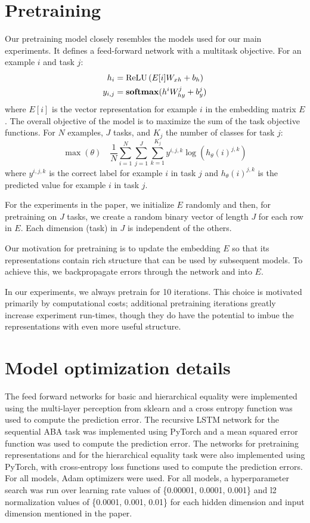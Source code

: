 \section{Pretraining}\label{app:pretraining}

Our pretraining model closely resembles the models used for our main experiments. It defines a feed-forward network with a multitask objective. For an example $i$ and task $j$:
%
\begin{align}
  h_{i} &= \operatorname{ReLU}\left( E[i]W_{xh} + b_{h} \right) \\
  y_{i,j} &= \mathbf{softmax}(h^{i}W_{hy}^{j} + b_{y}^{j})
\end{align}
%
where $E[i]$ is the vector representation for example $i$ in the embedding matrix $E$. The overall objective of the model is to maximize the sum of the task objective functions. For $N$ examples, $J$ tasks, and $K_{j}$ the number of classes for task $j$:
%
\begin{equation}
  \max(\theta)
  \quad
  \frac{1}{N}
  \sum_{i=1}^{N}
  \sum_{j=1}^{J}
  \sum_{k=1}^{K_{j}}
  y^{i,j,k} \log \left( h_{\theta}(i)^{j,k} \right)
\end{equation}
%
where $y^{i,j,k}$ is the correct label for example $i$ in task $j$ and $h_{\theta}(i)^{j,k}$ is the predicted value for example $i$ in task $j$.

For the experiments in the paper, we initialize $E$ randomly and then, for pretraining on $J$ tasks, we create a random binary vector of length $J$ for each row in $E$. Each dimension (task) in $J$ is independent of the others.

Our motivation for pretraining is to update the embedding $E$ so that its representations contain rich structure that can be used by subsequent models. To achieve this, we backpropagate errors through the network and into $E$.

In our experiments, we always pretrain for 10 iterations. This choice is motivated primarily by computational costs; additional pretraining iterations greatly increase experiment run-times, though they do have the potential to imbue the representations with even more useful structure.


\section{Model optimization details}\label{app:optimization}

The feed forward networks for basic and hierarchical equality were implemented using the multi-layer perception from sklearn and a cross entropy function was used to compute the prediction error. The recursive LSTM network for the sequential ABA task was implemented using PyTorch and a mean squared error function was used to compute the prediction error. The networks for pretraining representations and for the hierarchical equality task were also implemented using PyTorch, with cross-entropy loss functions used to compute the prediction errors. For all models, Adam optimizers \citep{Kingma:Ba:2015} were used. For all models, a hyperparameter search was run over learning rate values of \{0.00001, 0.0001, 0.001\} and l2 normalization values of \{0.0001, 0.001, 0.01\} for each hidden dimension and input dimension mentioned in the paper.


